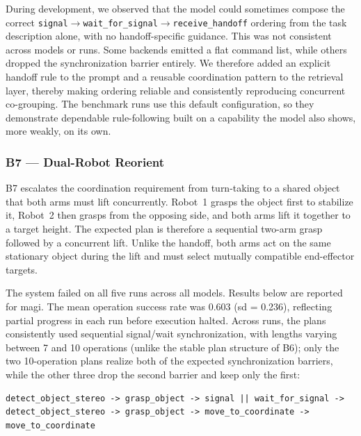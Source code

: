 During development, we observed that the model could sometimes compose the correct \texttt{signal}$\rightarrow$\texttt{wait\_for\_signal}$\rightarrow$\texttt{receive\_handoff} ordering from the task description alone, with no handoff-specific guidance. This was not consistent across models or runs. Some backends emitted a flat command list, while others dropped the synchronization barrier entirely. We therefore added an explicit handoff rule to the prompt and a reusable coordination pattern to the retrieval layer, thereby making ordering reliable and consistently reproducing concurrent co-grouping. The benchmark runs use this default configuration, so they demonstrate dependable rule-following built on a capability the model also shows, more weakly, on its own.

\subsubsection{B7 — Dual-Robot Reorient}
B7 escalates the coordination requirement from turn-taking to a shared object that both arms must lift concurrently. Robot~1 grasps the object first to stabilize it, Robot~2 then grasps from the opposing side, and both arms lift it together to a target height. The expected plan is therefore a sequential two-arm grasp followed by a concurrent lift. Unlike the handoff, both arms act on the same stationary object during the lift and must select mutually compatible end-effector targets.

The system failed on all five runs across all models. Results below are reported for \gls{magi}. The mean operation success rate was 0.603 (\gls{sd} = 0.236), reflecting partial progress in each run before execution halted. Across runs, the plans consistently used sequential signal/wait synchronization, with lengths varying between 7 and 10 operations (unlike the stable plan structure of B6); only the two 10-operation plans realize both of the expected synchronization barriers, while the other three drop the second barrier and keep only the first:

\begin{lstlisting}
detect_object_stereo -> grasp_object -> signal || wait_for_signal -> detect_object_stereo -> grasp_object -> move_to_coordinate -> move_to_coordinate
\end{lstlisting}

